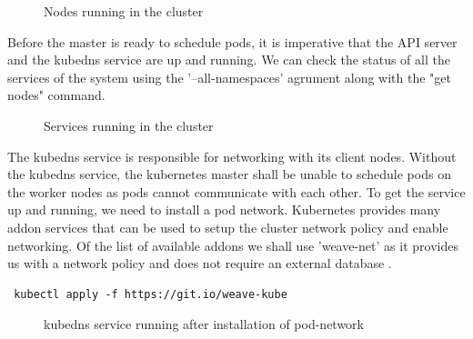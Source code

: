 \documentclass[9pt,twocolumn,twoside]{../../styles/osajnl}
\begin{document}
\begin{figure}[htbp]
\centering
{}
\caption{Nodes running in the cluster}
\label{Nodes running in the cluster}
\end{figure}

Before the master is ready to schedule pods, it is imperative that the
API server and the kubedns service are up and running. We can check
the status of all the services of the system using the
'--all-namespaces' agrument along with the "get nodes" command.

\begin{figure}[htbp]
\centering
{}
\caption{Services running in the cluster}
\label{Services running in the cluster}
\end{figure}


The kubedns service is responsible for networking with its client
nodes. Without the kubedns service, the kubernetes master shall be
unable to schedule pods on the worker nodes as pods cannot communicate
with each other. To get the service up and running, we need to install
a pod network.  Kubernetes provides many addon services that can be
used to setup the cluster network policy and enable networking. Of the
list of available addons we shall use 'weave-net' as it provides us
with a network policy and does not require an external database
\cite{www-kubernetes-addons}.

\begin{verbatim}
 kubectl apply -f https://git.io/weave-kube
\end{verbatim}

\begin{figure}[htbp]
\centering
{}
\caption{kubedns service running after installation of pod-network}
\label{kubedns service running after installation of pod-network}
\end{figure}
\end{document}
